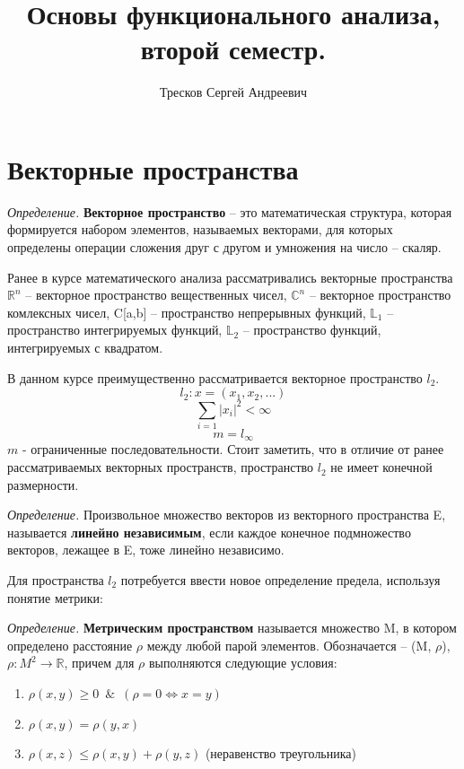 \documentclass[12pt]{article}
\newcommand{\equals}{\Leftrightarrow}
\newcommand{\defi}{{\itshape Определение. }}
\renewcommand{\leq}{\leqslant}
\renewcommand{\geq}{\geqslant}
\begin{document}
	\title{Основы функционального анализа, второй семестр.}
	\author{Тресков Сергей Андреевич}
	\maketitle
	
	\section{Векторные пространства}
	
	\defi \textbf{Векторное пространство} -- это математическая структура, которая формируется набором элементов, называемых векторами, для 
	которых 	определены операции сложения друг с другом и умножения на число -- скаляр.
	
	Ранее в курсе математического анализа рассматривались векторные пространства $\mathbb{R}^n$ -- векторное пространство вещественных
	чисел, $\mathbb{C}^n$ -- векторное пространство комлексных чисел, C[a,b] -- пространство непрерывных функций, $\mathbb{L}_1$ -- 
	пространство интегрируемых функций, $\mathbb{L}_2$ -- пространство функций, интегрируемых с квадратом.
	
	В данном курсе преимущественно рассматривается векторное пространство $l_2$.
	$$l_2 : x = (x_1, x_2, ...)$$
	$$\sum_{i=1} |x_i|^2 < \infty$$
	$$m = l_\infty$$ 
	$m$ - ограниченные последовательности.
	Стоит заметить, что в отличие от ранее рассматриваемых векторных пространств, пространство $l_2$ не имеет конечной размерности.
	
	\defi Произвольное множество векторов из векторного пространства E, называется \textbf{линейно независимым}, если каждое конечное
	подмножество векторов, лежащее в E, тоже линейно независимо.
	
	Для пространства $l_2$ потребуется ввести новое определение предела, используя понятие метрики:
	
	\defi \textbf{Метрическим пространством} называется множество M, в котором определено расстояние $\rho$ между любой парой элементов. Обозначается -- (M, $\rho$), $\rho : M^2 \rightarrow 
	\mathbb{R}$, причем для $\rho$ выполняются следующие условия:
	\begin{enumerate}
		\item $\rho(x,y) \geq 0$~$\&$~$(\rho = 0 \equals x=y)$
		\item $\rho(x,y) = \rho(y,x)$
		\item $\rho(x,z) \leq \rho(x,y) + \rho(y,z)$ (неравенство треугольника)
	\end{enumerate}
	
\end{document}
